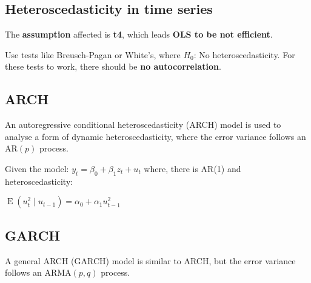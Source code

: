\documentclass[10pt, a4paper, landscape]{article}
\DeclareMathOperator{\E}{E}
\begin{document}
\begin{multicols}{3}
\section*{Heteroscedasticity in time series}

The \textbf{assumption} affected is \textbf{t4}, which leads \textbf{OLS to be not efficient}.

Use tests like Breusch-Pagan or White's, where \( H_{0} \): No heteroscedasticity. For these tests to work, there should be \textbf{no autocorrelation}.

\subsection*{ARCH}

An autoregressive conditional heteroscedasticity (ARCH) model is used to analyse a form of dynamic heteroscedasticity, where the error variance follows an \( \text{AR}(p) \) process.

Given the model: \( y_{t} = \beta_{0} + \beta_{1} z_{t} + u_{t} \) where, there is AR(1) and heteroscedasticity:

\begin{center}
	\( \E(u_{t}^{2} \mid u_{t - 1}) = \alpha_{0} + \alpha_{1} u_{t - 1}^{2} \)
\end{center}

\subsection*{GARCH}

A general ARCH (GARCH) model is similar to ARCH, but the error variance follows an \( \text{ARMA}(p, q) \) process.

\end{multicols}
\end{document}
